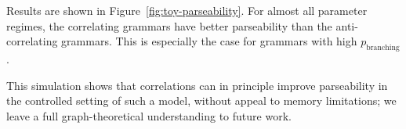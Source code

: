 \documentclass[10pt,twoside,lineno]{article}
\begin{document}
Results are shown in Figure~\ref{fig:toy-parseability}. For almost all parameter regimes, the correlating grammars have better parseability than the anti-correlating grammars. This is especially the case for grammars with high $p_\text{branching}$. 

This simulation shows that correlations can in principle improve parseability in the controlled setting of such a model, without appeal to memory limitations; we leave a full graph-theoretical understanding to future work.


\nocite{diessel2001ordering, dryer1980positional, wals} 




\end{document}
